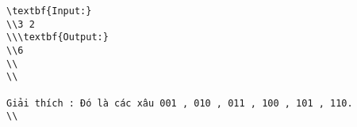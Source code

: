 \begin{verbatim}
\textbf{Input:}
\\3 2
\\\textbf{Output:}
\\6
\\
\\

Giải thích : Đó là các xâu 001 , 010 , 011 , 100 , 101 , 110.
\\\end{verbatim}